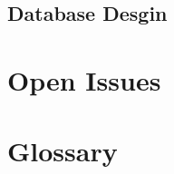 \documentclass[12pt]{article}
\begin{document}
		\subsection{Database Desgin} %
						
				\vspace{0.2in}
			
			
	
	\section{Open Issues}
	
		\vspace{0.2in}
		
		
	\newpage
	\section{Glossary}
	
		\vspace{0.2in}
		
			
	
	
\end{document}

